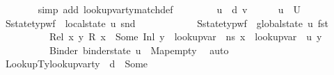 \begin{isabellebody}
\ \ \ \ \ \ \isamarkupfalse%
\ {\isacharparenleft}{\kern0pt}simp\ add{\isacharcolon}{\kern0pt}\ lookup{\isacharunderscore}{\kern0pt}var{\isacharunderscore}{\kern0pt}ty{\isacharunderscore}{\kern0pt}match{\isacharunderscore}{\kern0pt}def{\isacharparenright}{\kern0pt}\isanewline
\ \ \isamarkupfalse%
\isanewline
\ \ \ \ \isamarkupfalse%
\ u\ {\isasymtau}\ d\ v\isanewline
\ \ \ \ \isamarkupfalse%
\ {\isachardoublequoteopen}u\ {\isasymin}\ {\isacharquery}{\kern0pt}U{\isachardoublequoteclose}\isanewline
\ \ \ \ \isamarkupfalse%
\ S{}{\isacharcolon}{\kern0pt}{\isachardoublequoteopen}state{\isacharunderscore}{\kern0pt}typ{\isacharunderscore}{\kern0pt}wf\ {\isasymOmega}\ {\isacharparenleft}{\kern0pt}local{\isacharunderscore}{\kern0pt}state\ u{\isacharparenright}{\kern0pt}\ {\isacharparenleft}{\kern0pt}snd\ {\isasymLambda}{\isacharprime}{\kern0pt}{\isacharparenright}{\kern0pt}{\isachardoublequoteclose}\ \isanewline
\ \ \ \ \ \ \ \ \ \ S{}{\isacharcolon}{\kern0pt}{\isachardoublequoteopen}state{\isacharunderscore}{\kern0pt}typ{\isacharunderscore}{\kern0pt}wf\ {\isasymOmega}\ {\isacharparenleft}{\kern0pt}global{\isacharunderscore}{\kern0pt}state\ u{\isacharparenright}{\kern0pt}\ {\isacharparenleft}{\kern0pt}fst\ {\isasymLambda}{\isacharprime}{\kern0pt}{\isacharparenright}{\kern0pt}{\isachardoublequoteclose}\ \isanewline
\ \ \ \ \ \ \ \ \ \ Rel{}{\isacharcolon}{\kern0pt}\ {\isachardoublequoteopen}{\isacharparenleft}{\kern0pt}{\isasymforall}x\ y{\isachardot}{\kern0pt}\ R\ x\ {\isacharequal}{\kern0pt}\ Some\ {\isacharparenleft}{\kern0pt}Inl\ y{\isacharparenright}{\kern0pt}\ {\isasymlongrightarrow}\ lookup{\isacharunderscore}{\kern0pt}var\ {\isasymLambda}\ ns\ x\ {\isacharequal}{\kern0pt}\ lookup{\isacharunderscore}{\kern0pt}var\ {\isasymLambda}{\isacharprime}{\kern0pt}\ u\ y{\isacharparenright}{\kern0pt}{\isachardoublequoteclose}\ \isanewline
\ \ \ \ \ \ \ \ \ \ Binder{}{\isacharcolon}{\kern0pt}\ {\isachardoublequoteopen}binder{\isacharunderscore}{\kern0pt}state\ u\ {\isacharequal}{\kern0pt}\ Map{\isachardot}{\kern0pt}empty{\isachardoublequoteclose}\ \isamarkupfalse%
\ auto\isanewline
\ \ \ \ \isamarkupfalse%
\ LookupTy{\isacharcolon}{\kern0pt}{\isachardoublequoteopen}lookup{\isacharunderscore}{\kern0pt}var{\isacharunderscore}{\kern0pt}ty\ {\isasymLambda}{\isacharprime}{\kern0pt}\ d\ {\isacharequal}{\kern0pt}\ Some\ {\isasymtau}{\isachardoublequoteclose}\isanewline

\end{isabellebody}
